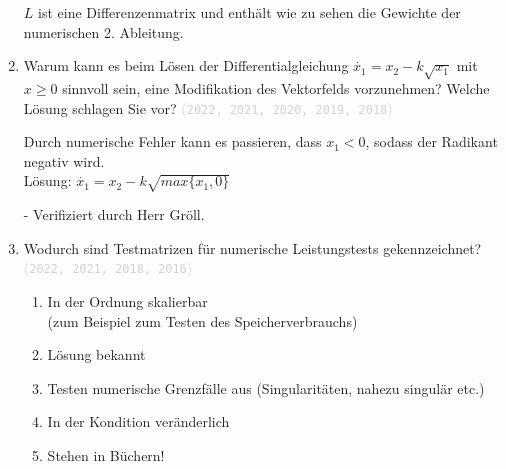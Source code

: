 \documentclass[12pt]{article}
\newcommand{\kommentarMacro}[1]{\textcolor{lightgray}{(\texttt{#1})}}
\begin{document}
\begin{enumerate}
\begin{solution}
              $L$ ist eine Differenzenmatrix und enthält wie zu sehen die Gewichte der numerischen 2. Ableitung.
          \end{solution}
          \pagebreak
    \item Warum kann es beim Lösen der Differentialgleichung $\dot{x_1} = x_2 - k \sqrt{x_1}$ mit \mbox{$x\geq 0$} sinnvoll sein, eine Modifikation des Vektorfelds vorzunehmen? Welche Lösung schlagen Sie vor? \kommentarMacro{2022, 2021, 2020, 2019, 2018}

          \begin{solution}
              Durch numerische Fehler kann es passieren, dass $x_1 < 0$, sodass der Radikant negativ wird.\\
              Lösung: $\dot{x_1} = x_2 - k\sqrt{max\{x_1, 0\}}$

              - Verifiziert durch Herr Gröll.
          \end{solution}
    \item Wodurch sind Testmatrizen für numerische Leistungstests gekennzeichnet? \\ \kommentarMacro{2022, 2021, 2018, 2016}
          \vspace{-0.5cm}
          \begin{solution}
              \begin{enumerate}[label=$(\roman*)$]
                  \item In der Ordnung skalierbar \\ (zum Beispiel zum Testen des Speicherverbrauchs)
                  \item Lösung bekannt
                  \item Testen numerische Grenzfälle aus (Singularitäten, nahezu singulär etc.)
                  \item In der Kondition veränderlich
                  \item Stehen in Büchern!
              \end{enumerate}
          \end{solution}

\end{enumerate}
\pagebreak
\end{document}
